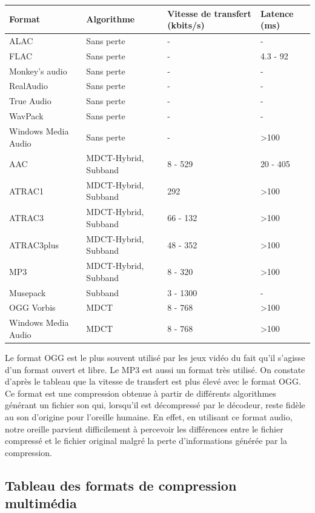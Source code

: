 \documentclass[a4paper, 12pt]{article} %
\begin{document}
\begin{center}
	\begin{tabular}{|p{}|p{}|p{}|p{}|}
		\hline
		Format & Algorithme & Vitesse de transfert (kbits/s) & Latence (ms)\\
		\hline
		ALAC & Sans perte & - & -\\
		FLAC & Sans perte & - & 4.3 - 92\\
		Monkey's audio & Sans perte & - & -\\
		RealAudio & Sans perte & - & - \\
		True Audio & Sans perte & - & - \\
		WavPack & Sans perte & - & - \\
		Windows Media Audio & Sans perte & - & >100\\
		\hline
		AAC & MDCT-Hybrid, Subband & 8 - 529 & 20 - 405\\
		ATRAC1 & MDCT-Hybrid, Subband & 292 & >100\\
		ATRAC3 & MDCT-Hybrid, Subband & 66 - 132 & >100\\
		ATRAC3plus & MDCT-Hybrid, Subband & 48 - 352 & >100\\
		MP3 & MDCT-Hybrid, Subband & 8 - 320 & >100\\
		Musepack & Subband & 3 - 1300 & - \\
		OGG Vorbis & MDCT & 8 - 768 & >100\\
		Windows Media Audio & MDCT & 8 - 768 & >100\\
		\hline
	\end{tabular}
\end{center}

Le format OGG est le plus souvent utilisé par les jeux vidéo du fait qu'il s'agisse d'un format ouvert et libre. Le MP3 est aussi un format très utilisé. On constate d'après le tableau que la vitesse de transfert est plus élevé avec le format OGG. Ce format est une compression obtenue à partir de différents algorithmes générant un fichier son qui, lorsqu'il est décompressé par le décodeur, reste fidèle au son d'origine pour l'oreille humaine. En effet, en utilisant ce format audio, notre oreille parvient difficilement à percevoir les différences entre le fichier compressé et le fichier original malgré la perte d'informations générée par la compression.

\subsection{Tableau des formats de compression multimédia}
\end{document}
